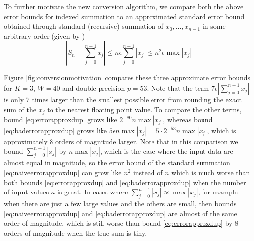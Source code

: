     To further motivate the new conversion algorithm, we compare both the above
    error bounds for indexed summation to an approximated standard error bound
    obtained through standard (recursive) summation of $x_0, ..., x_{n - 1}$ in
    some arbitrary order (given by \cite{higham})
    \begin{equation}
      |S_n - \sum_{j=0}^{n-1}x_j| \leq n \epsilon  \sum\limits_{j = 0}^{n - 1}|x_j| \leq n^2  \epsilon  \max|x_j|
      \label{eq:naiveerrorapproxdup}
    \end{equation}

    Figure \ref{fig:conversionmotivation} compares these three approximate error bounds
    for $K=3$, $W=40$ and double precision $p=53$.
    Note that the term $7 \epsilon |\sum\limits_{j = 0}^{n - 1}x_j|$ is only
    $7$ times larger than the smallest possible error from rounding the
    exact sum of the $x_j$ to the nearest floating point value. To compare the other terms, bound \eqref{eq:errorapproxdup} grows like $2^{-80}n\max|x_j|$,
    whereas bound \eqref{eq:baderrorapproxdup} grows like $5\epsilon n \max|x_j| = 5 \cdot 2^{-53}n\max|x_j|$, which is approximately $8$ orders of magnitude larger.
    Note that in this comparison we bound $\sum_{j=0}^{n-1} |x_j|$ by $n \max |x_j|$,
    which is the case where the input data are almost equal in magnitude,
    so the error bound of the standard summation \eqref{eq:naiveerrorapproxdup} can grow like $n^2$ instead of $n$ which is much worse than both bounds
    \eqref{eq:errorapproxdup} and \eqref{eq:baderrorapproxdup}
    when the number of input values $n$ is great.
    In cases where $\sum_{j=0}^{n-1} |x_j| \approx \max |x_j|$, for example
    when there are just a few large values and the others are small, then bounds
    \eqref{eq:naiveerrorapproxdup} and \eqref{eq:baderrorapproxdup} are almost
    of the same order of magnitude, which is still worse than bound \eqref{eq:errorapproxdup}
    by 8 orders of magnitude when the true sum is tiny.


